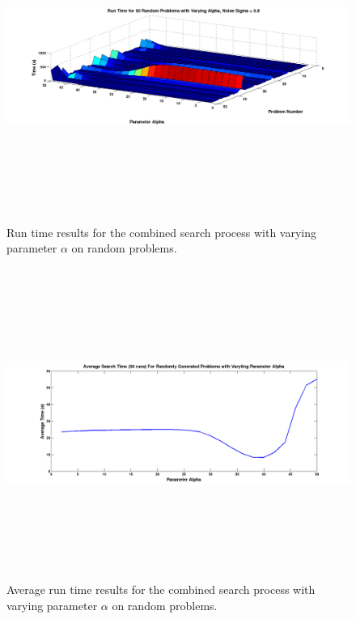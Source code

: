 \documentclass[12pt,Bold,letterpaper]{mcgilletdclass}
\begin{document}
\begin{figure}
\centering
\includegraphics[width=6.5in,height=4in]{searchsurface.png}
\caption{Run time results for the combined search process with varying parameter $\alpha$ on random problems.}
\label{fig:searchsurface}
\end{figure}

\begin{figure}
\centering
\includegraphics[width=6.5in,height=4in]{averageSearchTimes.png}
\caption{Average run time results for the combined search process with varying parameter $\alpha$ on random problems.}
\label{fig:searchAverage}
\end{figure}
\end{document}
